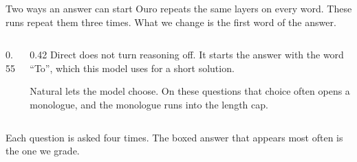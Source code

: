 \documentclass[aspectratio=169,11pt]{beamer}
\newcommand{\src}[1]{\par\vfill\begin{minipage}{0.96\textwidth}\color{muted}\tiny #1\end{minipage}\vspace{-0.2em}}
\begin{document}
\begin{frame}{Two ways an answer can start}
  Ouro repeats the same layers on every word. These runs repeat them three times.
  What we change is the first word of the answer.
  \vspace{0.7em}
  \begin{columns}[c]
    \begin{column}{0.55\textwidth}
    \end{column}
    \begin{column}{0.42\textwidth}
      {\small Direct does not turn reasoning off. It starts the answer with the word ``To'', which this model uses for a short solution.}
      \vspace{0.7em}

      {\small Natural lets the model choose. On these questions that choice often opens a monologue, and the monologue runs into the length cap.}
    \end{column}
  \end{columns}
  \src{Each question is asked four times. The boxed answer that appears most often is the one we grade.}
\end{frame}
\end{document}
